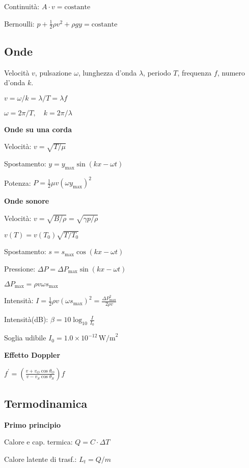 \documentclass[10pt]{article}
\begin{document}
\begin{multicols}{3}
Continuit\`a: $A \cdot v = \mathrm{costante}$

Bernoulli: $p + \frac 1 2 \rho v^2 + \rho g y =  \mathrm{costante}$

\subsection*{Onde}
Velocit\`a $v$, pulsazione $\omega$, lunghezza d'onda $\lambda$, periodo $T$, frequenza $f$, numero d'onda $k$.

$v=\omega/k=\lambda/T=\lambda f$

$\omega = 2\pi/T, \quad k=2\pi/\lambda$

\textbf{Onde su una corda}

Velocit\`a: $v=\sqrt{T/\mu}$

Spostamento: $y=y_\mathrm{max}\sin(kx - \omega t)$

Potenza: $P=\frac 1 2 \mu v (\omega y_\mathrm{max})^2$

\textbf{Onde sonore}

Velocit\`a: $v=\sqrt{B/\rho} = \sqrt{\gamma p/ \rho} $ 

$v(T) = v(T_0)\sqrt{T/T_0}$

Spostamento: $s=s_\mathrm{max}\cos(kx - \omega t )$ 

Pressione: $\Delta P=\Delta P_\mathrm{max}\sin(kx - \omega t)$

$\Delta P_\mathrm{max}=\rho v \omega s_\mathrm{max}$

Intensit\`a: $I=\frac 1 2 \rho v (\omega s_\mathrm{max}) ^2 =
 \frac{\Delta P_\mathrm{max}^2}{2 \rho v}$

Intensit\`a(dB): $\beta = 10\log_{10}\frac{I}{I_0}$

Soglia udibile $I_0=1.0\times 10^{-12}\,\mathrm{W/m}^2$

\textbf{Effetto Doppler}

$\displaystyle  f^\prime = \left( \frac{v+v_O\cos\theta_O}{v-v_S\cos\theta_S} \right) f$

\pagebreak
\subsection*{Termodinamica}


\textbf{Primo principio}

Calore e cap. termica: $Q = C\cdot\Delta T$

Calore latente di trasf.: $L_t = Q/m$


\end{multicols}
\end{document}
